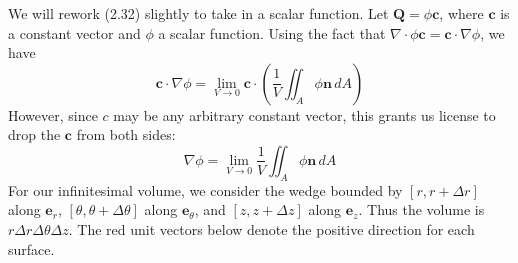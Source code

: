 \documentclass[a4paper]{article}
\begin{document}

We will rework (2.32) slightly to take in a scalar function. Let \( \pmb{Q} = \phi\pmb{c} \), where \( \pmb{c} \) is a constant vector and \( \phi \) a scalar function. Using the fact that \( \nabla \cdot \phi \pmb{c} = \pmb{c} \cdot \nabla \phi \), we have
\[
	\pmb{c} \cdot \nabla \phi = \lim\limits_{V \to 0}\pmb{c} \cdot \!\left( \frac{1}{V}\iint_{A} \phi \pmb{n} \, dA \right)
\]
However, since \( c \) may be any arbitrary constant vector, this grants us license to drop the \( \pmb{c} \) from both sides:
\[
	\nabla \phi = \lim\limits_{V \to 0}\frac{1}{V}\iint_{A} \phi \pmb{n} \, dA
\]
For our infinitesimal volume, we consider the wedge bounded by \( \!\left[ r, r + \Delta r \right] \) along \( \pmb{e}_{r} \), \( \!\left[ \theta,\theta + \Delta \theta \right] \) along \( \pmb{e}_{\theta} \), and \( \!\left[ z, z + \Delta z \right] \) along \( \pmb{e}_{z} \). Thus the volume is \( r \Delta r \Delta \theta \Delta z \). The red unit vectors below denote the positive direction for each surface.
\end{document}
